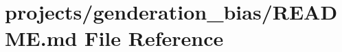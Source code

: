 \hypertarget{projects_2genderation__bias_2README_8md}{}\section{projects/genderation\+\_\+bias/\+R\+E\+A\+D\+ME.md File Reference}
\label{projects_2genderation__bias_2README_8md}
